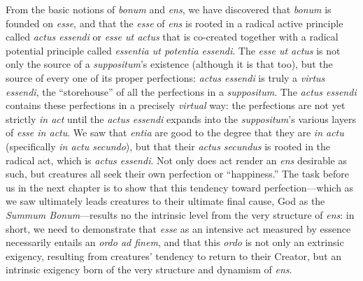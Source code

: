 From the basic notions of \emph{bonum} and \emph{ens}, we have discovered that \emph{bonum} is founded on \emph{esse}, and that the \emph{esse} of \emph{ens} is rooted in a radical active principle called \emph{actus essendi} or \emph{esse ut actus} that is co-created together with a radical potential principle called \emph{essentia ut potentia essendi}. The \emph{esse ut actus} is not only the source of a \emph{suppositum}'s existence (although it is that too), but the source of every one of its proper perfections: \emph{actus essendi} is truly a \emph{virtus essendi}, the ``storehouse'' of all the perfections in a \emph{suppositum}. The \emph{actus essendi} contains these perfections in a precisely \emph{virtual} way: the perfections are not yet strictly \emph{in act} until the \emph{actus essendi} expands into the \emph{suppositum}'s various layers of \emph{esse in actu}. We saw that \emph{entia} are good to the degree that they are \emph{in actu} (specifically \emph{in actu secundo}), but that their \emph{actus secundus} is rooted in the radical act, which is \emph{actus essendi}. Not only does act render an \emph{ens} desirable as such, but creatures all seek their own perfection or ``happiness.'' The task before us in the next chapter is to show that this tendency toward perfection---which as we saw ultimately leads creatures to their ultimate final cause, God as the \emph{Summum Bonum}---results no the intrinsic level from the very structure of \emph{ens}: in short, we need to demonstrate that \emph{esse} as an intensive act measured by essence necessarily entails an \emph{ordo ad finem}, and that this \emph{ordo} is not only an extrinsic exigency, resulting from creatures' tendency to return to their Creator, but an intrinsic exigency born of the very structure and dynamism of \emph{ens}.